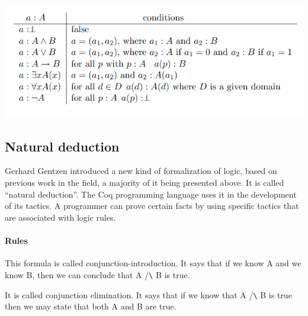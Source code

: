 \documentclass[a4paper,12pt]{book}
\begin{document}
\includegraphics[scale=0.6]{graph/intlog}

\subsection{Natural deduction}
Gerhard Gentzen introduced a new kind of formalization of logic, based on previous work in the field, a majority of it being presented above. It is called “natural deduction”. The Coq programming language uses it in the development of its tactics. A programmer can prove certain facts by using specific tactics that are associated with logic rules.

\paragraph{Rules}


This formula is called conjunction-introduction. It says that if we know A and we know B, then we can conclude that A /\verb+\+ B is true.

It is called conjunction elimination. It says that if we know that A /\verb+\+ B is true then we may state that both A and B are true.
\backmatter
\end{document}
